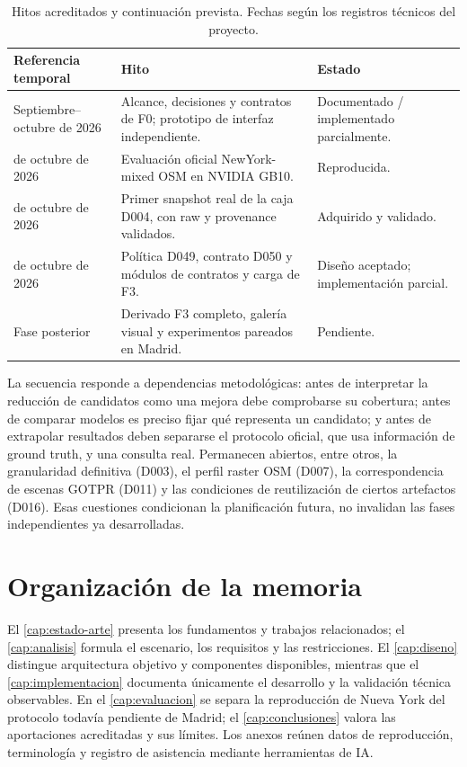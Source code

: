 \begin{table}[htbp]
\centering\small
\caption{Hitos acreditados y continuación prevista. Fechas según los registros técnicos del proyecto.}
\label{tab:hitos}
\begin{tabularx}{\linewidth}{@{}>{\raggedright\arraybackslash}p{2.7cm}X >{\raggedright\arraybackslash}p{2.7cm}@{}}
\toprule
Referencia temporal & Hito & Estado \\
\midrule
Septiembre--octubre de 2026 & Alcance, decisiones y contratos de F0; prototipo de interfaz independiente. & Documentado / implementado parcialmente. \\
5 de octubre de 2026 & Evaluación oficial NewYork-mixed OSM en NVIDIA GB10. & Reproducida. \\
6 de octubre de 2026 & Primer snapshot real de la caja D004, con raw y provenance validados. & Adquirido y validado. \\
7 de octubre de 2026 & Política D049, contrato D050 y módulos de contratos y carga de F3. & Diseño aceptado; implementación parcial. \\
Fase posterior & Derivado F3 completo, galería visual y experimentos pareados en Madrid. & Pendiente. \\
\bottomrule
\end{tabularx}
\end{table}

La secuencia responde a dependencias metodológicas: antes de interpretar la reducción de candidatos como una mejora debe comprobarse su cobertura; antes de comparar modelos es preciso fijar qué representa un candidato; y antes de extrapolar resultados deben separarse el protocolo oficial, que usa información de ground truth, y una consulta real. Permanecen abiertos, entre otros, la granularidad definitiva (D003), el perfil raster OSM (D007), la correspondencia de escenas GOTPR (D011) y las condiciones de reutilización de ciertos artefactos (D016). Esas cuestiones condicionan la planificación futura, no invalidan las fases independientes ya desarrolladas.

\section{Organización de la memoria}
\label{sec:organizacion}
El \cref{cap:estado-arte} presenta los fundamentos y trabajos relacionados; el \cref{cap:analisis} formula el escenario, los requisitos y las restricciones. El \cref{cap:diseno} distingue arquitectura objetivo y componentes disponibles, mientras que el \cref{cap:implementacion} documenta únicamente el desarrollo y la validación técnica observables. En el \cref{cap:evaluacion} se separa la reproducción de Nueva York del protocolo todavía pendiente de Madrid; el \cref{cap:conclusiones} valora las aportaciones acreditadas y sus límites. Los anexos reúnen datos de reproducción, terminología y registro de asistencia mediante herramientas de IA.

